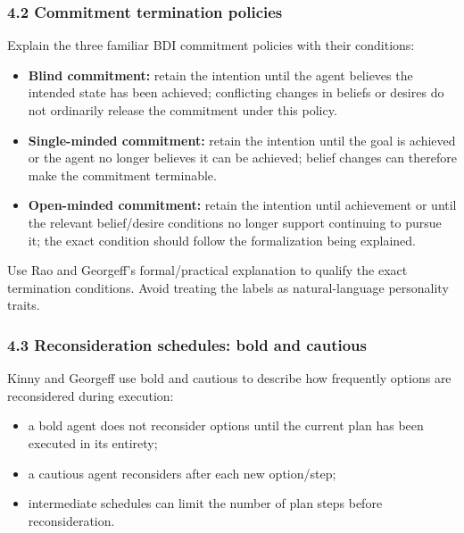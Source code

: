 \subsubsection{4.2 Commitment termination policies}\label{commitment-termination-policies}

Explain the three familiar BDI commitment policies with their conditions:

\begin{itemize}
\tightlist
\item
  \textbf{Blind commitment:} retain the intention until the agent believes the intended state has been achieved; conflicting changes in beliefs or desires do not ordinarily release the commitment under this policy.
\item
  \textbf{Single-minded commitment:} retain the intention until the goal is achieved or the agent no longer believes it can be achieved; belief changes can therefore make the commitment terminable.
\item
  \textbf{Open-minded commitment:} retain the intention until achievement or until the relevant belief/desire conditions no longer support continuing to pursue it; the exact condition should follow the formalization being explained.
\end{itemize}

Use Rao and Georgeff's formal/practical explanation to qualify the exact termination conditions. Avoid treating the labels as natural-language personality traits.\autocite{rao1991modelingbdi,rao1995bdi}

\subsubsection{4.3 Reconsideration schedules: bold and cautious}\label{reconsideration-schedules-bold-and-cautious}

Kinny and Georgeff use bold and cautious to describe how frequently options are reconsidered during execution:

\begin{itemize}
\tightlist
\item
  a bold agent does not reconsider options until the current plan has been executed in its entirety;
\item
  a cautious agent reconsiders after each new option/step;
\item
  intermediate schedules can limit the number of plan steps before reconsideration.
\end{itemize}

